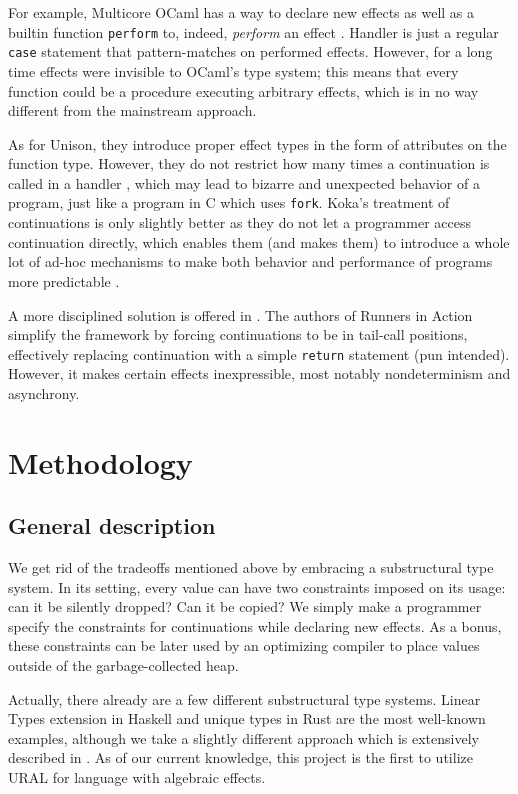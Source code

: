 \documentclass[conference]{IEEEtran}
\begin{document}
For example, Multicore OCaml has a way to declare new effects as well as a
builtin function \verb|perform| to, indeed, \textit{perform} an effect
\cite{ocaml}. Handler is just a regular \verb|case| statement that
pattern-matches on performed effects. However, for a long time effects were
invisible to OCaml's type system; this means that every function could be a
procedure executing arbitrary effects, which is in no way different from
the mainstream approach.

As for Unison, they introduce proper effect types in the form of attributes on
the function type. However, they do not restrict how many times a continuation
is called in a handler \cite{unrestricted}, which may lead to bizarre and
unexpected behavior of a program, just like a program in C which uses
\verb|fork|. Koka's treatment of continuations is only slightly better as they
do not let a programmer access continuation directly, which enables them (and
makes them) to introduce a whole lot of ad-hoc mechanisms to make both behavior
and performance of programs more predictable \cite{hidden}.

A more disciplined solution is offered in \cite{bauer}. The authors of Runners
in Action simplify the framework by forcing continuations to be in tail-call
positions, effectively replacing continuation with a simple \verb|return|
statement (pun intended). However, it makes certain effects inexpressible, most
notably nondeterminism and asynchrony.

\section{Methodology}

\subsection{General description}

We get rid of the tradeoffs mentioned above by embracing a substructural type
system. In its setting, every value can have two constraints imposed on its
usage: can it be silently dropped? Can it be copied? We simply make a programmer
specify the constraints for continuations while declaring new effects. As a
bonus, these constraints can be later used by an optimizing compiler to place
values outside of the garbage-collected heap.

Actually, there already are a few different substructural type systems.
Linear Types extension in Haskell \cite{linear} and unique types in Rust
\cite{rust} are the most well-known examples, although we take a slightly
different approach which is extensively described in \cite{ural}. As of our
current knowledge, this project is the first to utilize URAL for language with
algebraic effects.
\end{document}
